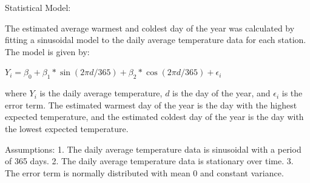 \documentclass[
]{article}
\begin{document}
Statistical Model:

The estimated average warmest and coldest day of the year was calculated
by fitting a sinusoidal model to the daily average temperature data for
each station. The model is given by:

\(Y_i = \beta_0 + \beta_1 * \sin(2\pi d/365) + \beta_2*\cos(2\pi d/365) + \epsilon_i\)

where \(Y_i\) is the daily average temperature, \(d\) is the day of the
year, and \(\epsilon_i\) is the error term. The estimated warmest day of
the year is the day with the highest expected temperature, and the
estimated coldest day of the year is the day with the lowest expected
temperature.

Assumptions: 1. The daily average temperature data is sinusoidal with a
period of 365 days. 2. The daily average temperature data is stationary
over time. 3. The error term is normally distributed with mean 0 and
constant variance.
\end{document}
